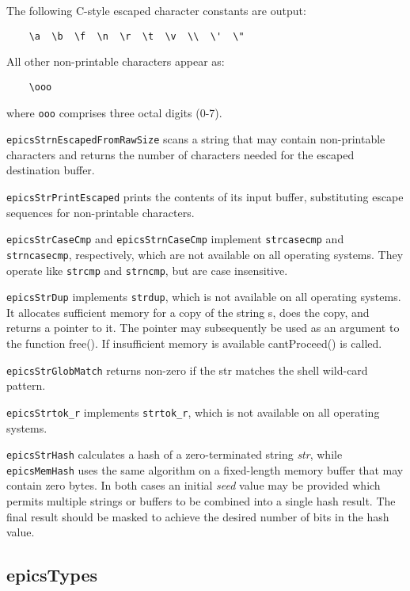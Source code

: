 The following C-style escaped character constants are output:

\begin{verbatim}    \a  \b  \f  \n  \r  \t  \v  \\  \'  \"
\end{verbatim}All other non-printable characters appear as:

\begin{verbatim}    \ooo
\end{verbatim}where \verb|ooo| comprises three octal digits (0-7).  

\verb|epicsStrnEscapedFromRawSize| scans a string that may contain non-printable characters and returns the number of 
characters needed for the escaped destination buffer.

\verb|epicsStrPrintEscaped| prints the contents of its input buffer, substituting escape sequences for non-printable 
characters.

\verb|epicsStrCaseCmp| and \verb|epicsStrnCaseCmp| implement \verb|strcasecmp| and \verb|strncasecmp|, respectively, which 
are not available on all operating systems. They operate like \verb|strcmp| and \verb|strncmp|, but are case insensitive.

\verb|epicsStrDup| implements \verb|strdup|, which is not available on all operating systems.  It allocates sufficient memory for 
a copy of the string s, does the copy, and returns a pointer to it.  The pointer may subsequently be used as an argument to 
the function free().  If insufficient memory is available cantProceed() is called.

\verb|epicsStrGlobMatch| returns non-zero if the str matches the shell wild-card pattern.

\verb|epicsStrtok_r| implements \verb|strtok_r|, which is not available on all operating systems.

\verb|epicsStrHash| calculates a hash of a zero-terminated string \emph{str}, while \verb|epicsMemHash| uses the same algorithm on a 
fixed-length memory buffer that may contain zero bytes. In both cases an initial \emph{seed} value may be provided which 
permits multiple strings or buffers to be combined into a single hash result. The final result should be masked to achieve 
the desired number of bits in the hash value.

\subsection{epicsTypes}

